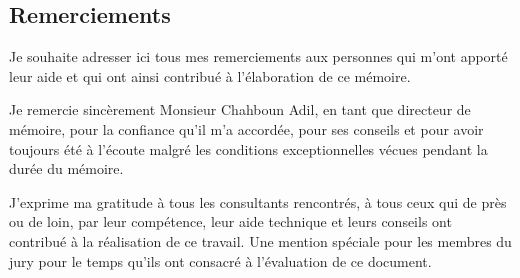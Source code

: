 \newpage
\vspace*{\fill}
\begin{center}
\section*{Remerciements}
\end{center}
\vspace*{3cm}
\par Je souhaite adresser ici tous mes remerciements aux personnes qui m'ont apporté leur aide et qui ont ainsi contribué à l'élaboration de ce mémoire.
\par
Je remercie sincèrement Monsieur Chahboun Adil, en tant que directeur de mémoire, pour la confiance qu'il m'a accordée, pour ses conseils et pour avoir toujours été à l'écoute malgré les conditions exceptionnelles vécues pendant la durée du mémoire.
\par
J'exprime ma gratitude à tous les consultants rencontrés, à tous ceux qui de près ou de loin, par leur compétence, leur aide technique et leurs conseils ont contribué à la réalisation de ce travail. Une mention spéciale pour les membres du jury pour le temps qu’ils ont consacré à l’évaluation de ce document.
\vspace*{\fill}
\newpage
\printnomenclature


\newpage
\tableofcontents
\newpage

